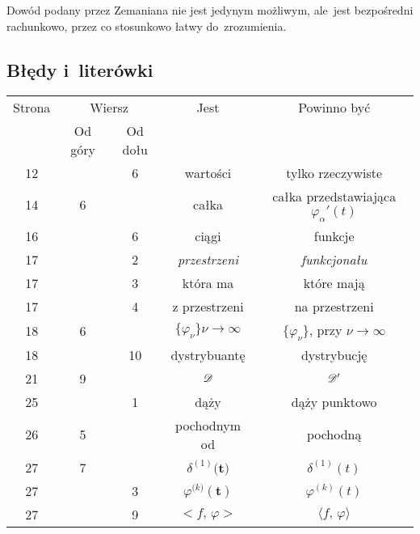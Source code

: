 \documentclass[a4paper,11pt]{article}
\begin{document}
Dowód podany przez Zemaniana nie jest jedynym możliwym, ale~jest
bezpośredni rachunkowo, przez co stosunkowo łatwy do~zrozumienia.





\subsection{Błędy i~literówki}

\label{sec:Bledy-i-literowski}

\VerSpaceThree


\begin{center}

  \begin{tabular}{|c|c|c|c|c|}
    \hline
    Strona & \multicolumn{2}{c|}{Wiersz} & Jest
                              & Powinno być \\ \cline{2-3}
    & Od góry & Od dołu & & \\
    \hline
    12  & & \hphantom{0}6 & wartości & tylko rzeczywiste \\
    14  & \hphantom{0}6 & & całka
    & całka przedstawiająca $\varphi_{ \alpha }'( t )$ \\
    16  & & \hphantom{0}6 & ciągi & funkcje \\
    17  & & \hphantom{0}2 & \textit{przestrzeni} & \textit{funkcjonału} \\
    17  & & \hphantom{0}3 & która ma & które mają \\
    17  & & \hphantom{0}4 & z przestrzeni & na przestrzeni \\
    18  & \hphantom{0}6 & & $\{ \varphi_{ \nu } \}\nu \to \infty$
    & $\{ \varphi_{ \nu } \}$, przy $\nu \to \infty$ \\
    18  & & 10 & dystrybuantę & dystrybucję \\
    21  & \hphantom{0}9 & & $\mathcal{D}$ & $\mathcal{D}'$ \\
    25  & & \hphantom{0}1 & dąży & dąży punktowo \\
    26  & \hphantom{0}5 & & pochodnym od & pochodną \\
    27  & \hphantom{0}7 & & $\delta^{ ( 1 ) }\boldsymbol{ ( t } )$
    & $\delta^{ ( 1 ) }( t )$ \\
    27  & & \hphantom{0}3 & $\varphi^{ ( k \boldsymbol{ ) } }\boldsymbol{ ( t ) } $
           & $\varphi^{ ( k ) }( t )$ \\
    27  & & \hphantom{0}9 & $< f,\, \varphi >$ & $\langle f, \, \varphi \rangle$ \\

\end{tabular}
\end{center}
\end{document}
